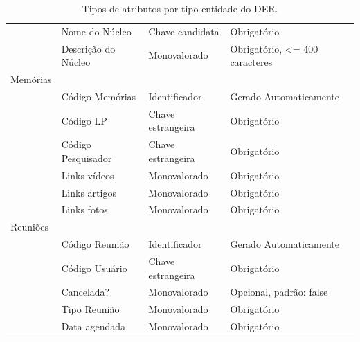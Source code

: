 \documentclass[11pt]{../../classes/ifscarticle}
\begin{document}
\begin{table}[h]
\begin{tabular}{l|l|l|l|}
                  & Nome do Núcleo      & Chave candidata   & Obrigatório                    \\
                  & Descrição do Núcleo & Monovalorado      & Obrigatório, <= 400 caracteres \\
    \hline
    Memórias \\
                  & Código Memórias     & Identificador     & Gerado Automaticamente \\
                  & Código LP           & Chave estrangeira & Obrigatório            \\
                  & Código Pesquisador  & Chave estrangeira & Obrigatório            \\
                  & Links vídeos        & Monovalorado      & Obrigatório            \\
                  & Links artigos       & Monovalorado      & Obrigatório            \\
                  & Links fotos         & Monovalorado      & Obrigatório            \\
    \hline
    Reuniões \\
                  & Código Reunião      & Identificador     & Gerado Automaticamente  \\
                  & Código Usuário      & Chave estrangeira & Obrigatório             \\
                  & Cancelada?          & Monovalorado      & Opcional, padrão: false \\
                  & Tipo Reunião        & Monovalorado      & Obrigatório             \\
                  & Data agendada       & Monovalorado      & Obrigatório             \\
    \hline
  \end{tabular}
  \caption{Tipos de atributos por tipo-entidade do DER.}
\end{table}




\end{document}
